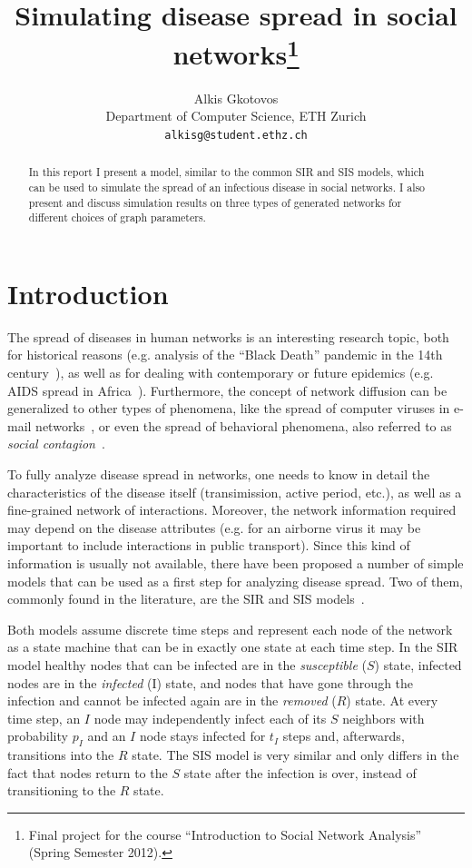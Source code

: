 \documentclass[11pt]{article} %
\title{Simulating disease spread in social networks\thanks{Final project
for the course ``Introduction to Social Network Analysis'' (Spring
Semester 2012).}}
\author{
Alkis Gkotovos\\
Department of Computer Science, ETH Zurich\\
\texttt{alkisg@student.ethz.ch}
}
\begin{document}
\maketitle

\begin{abstract}
In this report I present a model, similar to the common SIR and SIS models,
which can be used to simulate the spread of an infectious disease in
social networks. I also present and discuss simulation results on three
types of generated networks for different choices of graph parameters.
\end{abstract}

\section{Introduction}
The spread of diseases in human networks is an interesting research topic, both
for historical reasons (e.g. analysis of the ``Black Death'' pandemic in the
14th century~\cite{blackdeath}), as well as for dealing with contemporary or
future epidemics (e.g. AIDS spread in Africa~\cite{aids}). Furthermore, the
concept of network diffusion can be generalized to other types of phenomena,
like the spread of computer viruses in e-mail networks~\cite{email}, or even
the spread of behavioral phenomena, also referred to as
\emph{social contagion}~\cite{contagion}.

To fully analyze disease spread in networks, one needs to know in detail the
characteristics of the disease itself (transimission, active period, etc.),
as well as a fine-grained network of interactions. Moreover, the network
information required may depend on the disease attributes (e.g. for an airborne virus
it may be important to include interactions in public transport). Since this
kind of information is usually not available, there have been proposed a
number of simple models that can be used as a first step for analyzing disease
spread. Two of them, commonly found in the literature, are the SIR and SIS
models~\cite{easley, newman}.

Both models assume discrete time steps and represent each node of the network
as a state machine that can be in exactly one state at each time step. In the
SIR model healthy nodes that can be infected are in the \emph{susceptible} ($S$)
state, infected nodes are in the \emph{infected} (I) state, and nodes that have
gone through the infection and cannot be infected again are in the \emph{removed}
($R$) state. At every time step, an $I$ node may independently infect each of
its $S$ neighbors with probability $p_I$ and an $I$ node stays infected for
$t_I$ steps and, afterwards, transitions into the $R$ state.
The SIS model is very similar and only differs in the fact that nodes return
to the $S$ state after the infection is over, instead of transitioning to the
$R$ state.
\end{document}
